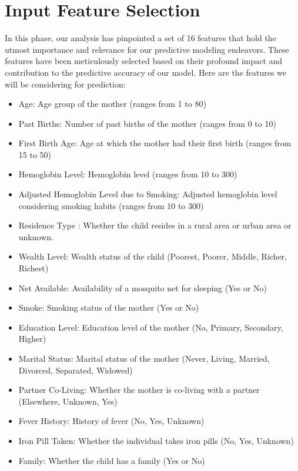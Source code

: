 \section{Input Feature Selection}
In this phase, our analysis has pinpointed a set of 16 features that hold the utmost importance and relevance for our predictive modeling endeavors. These features have been meticulously selected based on their profound impact and contribution to the predictive accuracy of our model. Here are the features we will be considering for prediction:
\begin{itemize}
    \item Age: Age group of the mother (ranges from 1 to 80)
    \item Past Births: Number of past births of the mother (ranges from 0 to 10)
    \item First Birth Age: Age at which the mother had their first birth (ranges from 15 to 50)
    \item Hemoglobin Level: Hemoglobin level (ranges from 10 to 300)
    \item Adjusted Hemoglobin Level due to Smoking: Adjusted hemoglobin level considering smoking habits (ranges from 10 to 300)
    \item Residence Type : Whether the child resides in a rural area or urban area or unknown.
    \item Wealth Level: Wealth status of the child (Poorest, Poorer, Middle, Richer, Richest)
    \item Net Available: Availability of a mosquito net for sleeping (Yes or No)
    \item Smoke: Smoking status of the mother (Yes or No)
    \item Education Level: Education level of the mother (No, Primary, Secondary, Higher)
    \item Marital Status: Marital status of the mother (Never, Living, Married, Divorced, Separated, Widowed)
    \item Partner Co-Living: Whether the mother is co-living with a partner (Elsewhere, Unknown, Yes)
    \item Fever History: History of fever (No, Yes, Unknown)
    \item Iron Pill Taken: Whether the individual takes iron pills (No, Yes, Unknown)
    \item Family: Whether the child has a family (Yes or No)
\end{itemize}
